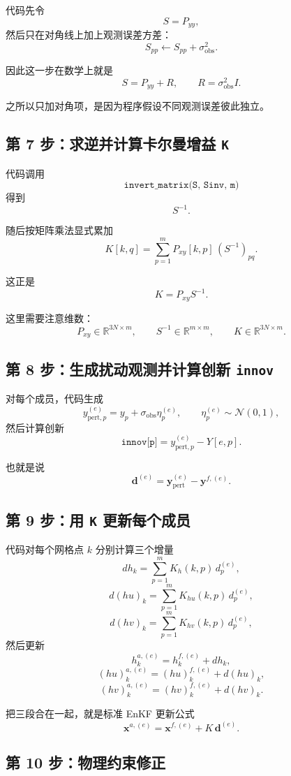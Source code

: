 \documentclass[12pt,a4paper]{article}
\begin{document}
代码先令
\[
S = P_{yy},
\]
然后只在对角线上加上观测误差方差：
\[
S_{pp} \leftarrow S_{pp} + \sigma_{\mathrm{obs}}^2.
\]

因此这一步在数学上就是
\[
S = P_{yy} + R,
\qquad R = \sigma_{\mathrm{obs}}^2 I.
\]

之所以只加对角项，是因为程序假设不同观测误差彼此独立。

\subsection{第 7 步：求逆并计算卡尔曼增益 \texttt{K}}

代码调用
\[
\texttt{invert\_matrix(S, Sinv, m)}
\]
得到
\[
S^{-1}.
\]

随后按矩阵乘法显式累加
\[
K[k,q]
= \sum_{p=1}^{m} P_{xy}[k,p]\,(S^{-1})_{pq}.
\]

这正是
\[
K = P_{xy}S^{-1}.
\]

这里需要注意维数：
\[
P_{xy}\in \mathbb{R}^{3N\times m},\qquad
S^{-1}\in \mathbb{R}^{m\times m},\qquad
K\in \mathbb{R}^{3N\times m}.
\]

\subsection{第 8 步：生成扰动观测并计算创新 \texttt{innov}}

对每个成员，代码生成
\[
y^{(e)}_{\mathrm{pert},p}
= y_p + \sigma_{\mathrm{obs}} \eta_p^{(e)},
\qquad \eta_p^{(e)}\sim \mathcal{N}(0,1),
\]
然后计算创新
\[
\texttt{innov[p]} = y^{(e)}_{\mathrm{pert},p} - Y[e,p].
\]

也就是说
\[
\mathbf{d}^{(e)}
= \mathbf{y}^{(e)}_{\mathrm{pert}} - \mathbf{y}^{f,(e)}.
\]

\subsection{第 9 步：用 \texttt{K} 更新每个成员}

代码对每个网格点 $k$ 分别计算三个增量
\[
dh_k = \sum_{p=1}^{m} K_{h}(k,p)\, d_p^{(e)},
\]
\[
d(hu)_k = \sum_{p=1}^{m} K_{hu}(k,p)\, d_p^{(e)},
\]
\[
d(hv)_k = \sum_{p=1}^{m} K_{hv}(k,p)\, d_p^{(e)},
\]
然后更新
\[
h_k^{a,(e)} = h_k^{f,(e)} + dh_k,
\]
\[
(hu)_k^{a,(e)} = (hu)_k^{f,(e)} + d(hu)_k,
\]
\[
(hv)_k^{a,(e)} = (hv)_k^{f,(e)} + d(hv)_k.
\]

把三段合在一起，就是标准 EnKF 更新公式
\[
\mathbf{x}^{a,(e)}
= \mathbf{x}^{f,(e)} + K\,\mathbf{d}^{(e)}.
\]

\subsection{第 10 步：物理约束修正}
\end{document}
